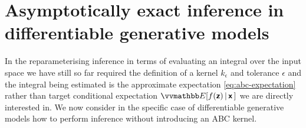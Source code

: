 
\section[Inference in differentiable generative models]{Asymptotically exact inference in \\ differentiable generative models}

In the reparameterising inference in terms of evaluating an integral over the input space we have still so far required the definition of a kernel $k_\epsilon$ and tolerance $\epsilon$ and the integral being estimated is the approximate expectation \eqref{eq:abc-expectation} rather than target conditional expectation $\expc{f(\rvct{z}) \gvn \rvct{x}\,}$ we are directly interested in. We now consider in the specific case of differentiable generative models how to perform inference without introducing an \ac{ABC} kernel.

